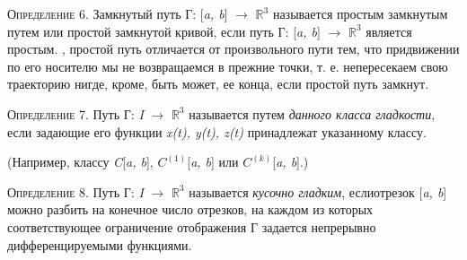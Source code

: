 \documentclass[a4paper, 10pt]{book}
\begin{document}
    \par\textsc{Определение 6.} Замкнутый путь Г: [\textit{a, b}] $\rightarrow$ $\mathbb{R}^{3}$ называется простым замкнутым путем или простой замкнутой кривой, если путь Г: [\textit{a, b}] $\rightarrow$ $\mathbb{R}^{3}$ является простым.
    , простой путь отличается от произвольного пути тем, что придвижении по его носителю мы не возвращаемся в прежние точки, т. е. непересекаем свою траекторию нигде, кроме, быть может, ее конца, если простой путь замкнут.
    \par\textsc{Определение 7.} Путь Г: \textit{I} $\rightarrow$ $\mathbb{R}^{3}$ называется путем \textit{данного класса гладкости}, если задающие его функции \textit{x(t), y(t), z(t)} принадлежат указанному классу.
    \par(Например, классу \textit{C}[\textit{a, b}], ${C}^{(1)}$[\textit{a, b}] или ${C}^{(k)}$[\textit{a, b}].)
    \par\textsc{Определение 8.} Путь Г: \textit{I} $\rightarrow$ $\mathbb{R}^{3}$ называется \textit{кусочно гладким}, еслиотрезок [\textit{a, b}] можно разбить на конечное число отрезков, на каждом из которых соответствующее ограничение отображения Г задается непрерывно дифференцируемыми функциями.
\end{document}
